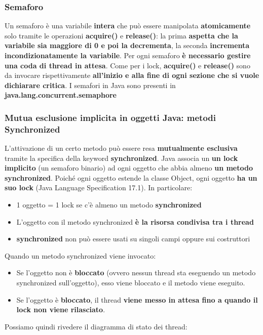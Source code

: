 \documentclass[12pt]{article}
\begin{document}
\subsubsection{Semaforo}
Un semaforo è una variabile \textbf{intera} che può essere manipolata \textbf{atomicamente} solo tramite le operazioni \textbf{acquire()} e \textbf{release()}: la prima \textbf{aspetta che la variabile sia maggiore di 0 e poi la decrementa}, la seconda \textbf{incrementa incondizionatamente la variabile}. Per ogni semaforo \textbf{è necessario gestire una coda di thread in attesa}. Come per i lock, \textbf{acquire()} e \textbf{release()} sono da invocare rispettivamente \textbf{all'inizio e alla fine di ogni sezione che si vuole dichiarare critica}. I semafori in Java sono presenti in \textbf{java.lang.concurrent.semaphore}
\subsubsection{Mutua esclusione implicita in oggetti Java: metodi Synchronized}
L'attivazione di un certo metodo può essere resa \textbf{mutualmente esclusiva} tramite la specifica della keyword \textbf{synchronized}. Java associa un \textbf{un lock implicito} (un semaforo binario) ad ogni oggetto che abbia almeno \textbf{un metodo synchronized}. Poiché ogni oggetto estende la classe Object, ogni oggetto \textbf{ha un suo lock} (Java Language Specification 17.1). In particolare:
\begin{itemize}
    \item 1 oggetto = 1 lock se c'è almeno un metodo \textbf{synchronized}
    \item L'oggetto con il metodo synchronized \textbf{è la risorsa condivisa tra i thread}
    \item \textbf{synchronized} non può essere usati su singoli campi oppure sui costruttori
\end{itemize}
Quando un metodo synchronized viene invocato:
\begin{itemize}
    \item Se l'oggetto non è \textbf{bloccato} (ovvero nessun thread sta eseguendo un metodo synchronized sull'oggetto), esso viene bloccato e il metodo viene eseguito.
    \item Se l'oggetto è \textbf{bloccato}, il thread \textbf{viene messo in attesa fino a quando il lock non viene rilasciato}.
\end{itemize}
Possiamo quindi rivedere il diagramma di stato dei thread:
\end{document}
